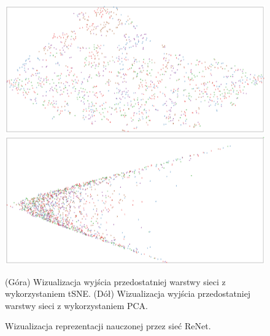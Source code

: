 \documentclass[oneside, mag]{mgr}
\begin{document}
\begin{figure}
\centering
	\includegraphics[width=1.0\textwidth]{img/tSNE_ReNet.png}
	\includegraphics[width=1.0\textwidth]{img/PCA_ReNet.png}
	\caption{Wizualizacja reprezentacji nauczonej przez sieć ReNet.} (Góra) Wizualizacja wyjścia przedostatniej warstwy sieci z wykorzystaniem tSNE. (Dół) Wizualizacja wyjścia przedostatniej warstwy sieci z wykorzystaniem PCA.
	\label{fig:tSNE_ReNet}
\end{figure}
\end{document}
